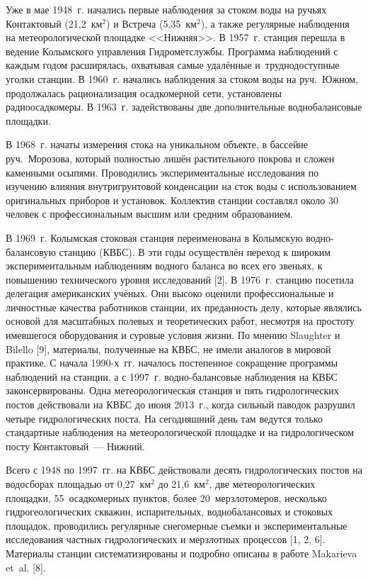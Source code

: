 Уже в мае 1948~г. начались первые наблюдения за стоком воды на ручьях Контактовый (21,2~км$^2$) и Встреча (5,35~км$^2$), а также регулярные наблюдения на метеорологической площадке <<Нижняя>>. В 1957~г. станция перешла в ведение Колымского управления Гидрометслужбы. Программа наблюдений с каждым годом расширялась, охватывая самые удалённые и~труднодоступные уголки станции. В 1960~г. начались наблюдения за стоком воды на руч.~Южном, продолжалась рационализация осадкомерной сети, установлены радиоосадкомеры. В 1963~г. задействованы две дополнительные воднобалансовые площадки.

В 1968~г. начаты измерения стока на уникальном объекте, в бассейне руч.~Морозова, который полностью лишён растительного покрова и сложен каменными осыпями. Проводились экспериментальные исследования по изучению влияния внутригрунтовой конденсации на сток воды с использованием оригинальных приборов и установок. Коллектив станции составлял около 30 человек с профессиональным высшим или средним образованием.

В 1969~г. Колымская стоковая станция переименована в Колымскую водно-балансовую станцию (КВБС). В эти годы осуществлён переход к широким экспериментальным наблюдениям водного баланса во всех его звеньях, к повышению технического уровня исследований [2]. В 1976~г. станцию посетила делегация американских учёных. Они высоко оценили профессиональные и личностные качества работников станции, их преданность делу, которые являлись основой для масштабных полевых и теоретических работ, несмотря на простоту имевшегося оборудования и суровые условия жизни. По мнению Slaughter и Bilello [9], материалы, полученные на КВБС, не имели аналогов в мировой практике.
\clearpage
С начала 1990-х~гг. началось постепенное сокращение программы наблюдений на станции, а с 1997~г. водно-балансовые наблюдения на КВБС законсервированы. Одна метеорологическая станция и пять гидрологических постов действовали на КВБС до июня 2013~г., когда сильный паводок разрушил четыре гидрологических поста. На сегодняшний день там ведутся только стандартные наблюдения на метеорологической площадке и на гидрологическом посту Контактовый~--- Нижний.

Всего с 1948 по 1997~гг. на КВБС действовали десять гидрологических постов на водосборах площадью от 0,27~км$^2$ до 21,6~км$^2$, две метеорологических площадки, 55~осадкомерных пунктов, более 20~мерзлотомеров, несколько гидрогеологических скважин, испарительных, воднобалансовых и стоковых площадок, проводились регулярные снегомерные съемки и экспериментальные исследования частных гидрологических и мерзлотных процессов [1, 2, 6]. Материалы станции систематизированы и подробно описаны в работе Makarieva et~al. [8].

